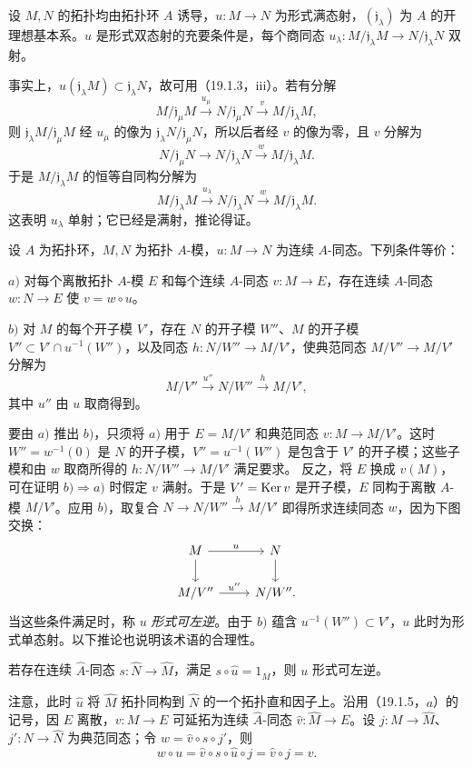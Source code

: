 设 $M,N$ 的拓扑均由拓扑环 $A$ 诱导，$u:M\to N$ 为形式满态射，$(\mathfrak j_\lambda)$ 为 $A$ 的开理想基本系。$u$ 是形式双态射的充要条件是，每个商同态 $u_\lambda:M/\mathfrak j_\lambda M\to N/\mathfrak j_\lambda N$ 双射。

事实上，$u(\mathfrak j_\lambda M)\subset\mathfrak j_\lambda N$，故可用（19.1.3，iii）。若有分解
\[
 M/\mathfrak j_\mu M\xrightarrow{u_\mu}N/\mathfrak j_\mu N\xrightarrow{v}M/\mathfrak j_\lambda M,
\]
则 $\mathfrak j_\lambda M/\mathfrak j_\mu M$ 经 $u_\mu$ 的像为 $\mathfrak j_\lambda N/\mathfrak j_\mu N$，所以后者经 $v$ 的像为零，且 $v$ 分解为
\[
 N/\mathfrak j_\mu N\to N/\mathfrak j_\lambda N\xrightarrow{w}M/\mathfrak j_\lambda M.
\]
于是 $M/\mathfrak j_\lambda M$ 的恒等自同构分解为
\[
 M/\mathfrak j_\lambda M\xrightarrow{u_\lambda}N/\mathfrak j_\lambda N\xrightarrow{w}M/\mathfrak j_\lambda M.
\]
这表明 $u_\lambda$ 单射；它已经是满射，推论得证。

设 $A$ 为拓扑环，$M,N$ 为拓扑 $A$-模，$u:M\to N$ 为连续 $A$-同态。下列条件等价：

$a)$ 对每个离散拓扑 $A$-模 $E$ 和每个连续 $A$-同态 $v:M\to E$，存在连续 $A$-同态 $w:N\to E$ 使 $v=w\circ u$。

$b)$ 对 $M$ 的每个开子模 $V'$，存在 $N$ 的开子模 $W''$、$M$ 的开子模 $V''\subset V'\cap u^{-1}(W'')$，以及同态 $h:N/W''\to M/V'$，使典范同态 $M/V''\to M/V'$ 分解为
\[
 M/V''\xrightarrow{u''}N/W''\xrightarrow{h}M/V',
\]
其中 $u''$ 由 $u$ 取商得到。

要由 $a)$ 推出 $b)$，只须将 $a)$ 用于 $E=M/V'$ 和典范同态 $v:M\to M/V'$。这时 $W''=w^{-1}(0)$ 是 $N$ 的开子模，$V''=u^{-1}(W'')$ 是包含于 $V'$ 的开子模；这些子模和由 $w$ 取商所得的 $h:N/W''\to M/V'$ 满足要求。
反之，将 $E$ 换成 $v(M)$，可在证明 $b)\Rightarrow a)$ 时假定 $v$ 满射。于是 $V'=\operatorname{Ker} v$ 是开子模，$E$ 同构于离散 $A$-模 $M/V'$。应用 $b)$，取复合 $N\to N/W''\xrightarrow{h}M/V'$ 即得所求连续同态 $w$，因为下图交换：
\[
\begin{tikzcd}
 M\arrow[r,"u"]\arrow[d] & N\arrow[d]\\
 M/V''\arrow[r,"u''"] & N/W''.
\end{tikzcd}
\]
当这些条件满足时，称 $u$ \emph{形式可左逆}。由于 $b)$ 蕴含 $u^{-1}(W'')\subset V'$，$u$ 此时为形式单态射。以下推论也说明该术语的合理性。

若存在连续 $\widehat A$-同态 $s:\widehat N\to\widehat M$，满足 $s\circ\widehat u=1_{\widehat M}$，则 $u$ 形式可左逆。

注意，此时 $\widehat u$ 将 $\widehat M$ 拓扑同构到 $\widehat N$ 的一个拓扑直和因子上。沿用（19.1.5，$a$）的记号，因 $E$ 离散，$v:M\to E$ 可延拓为连续 $\widehat A$-同态 $\widehat v:\widehat M\to E$。设 $j:M\to\widehat M$、$j':N\to\widehat N$ 为典范同态；令 $w=\widehat v\circ s\circ j'$，则
\[
 w\circ u=\widehat v\circ s\circ\widehat u\circ j=\widehat v\circ j=v.
\]

